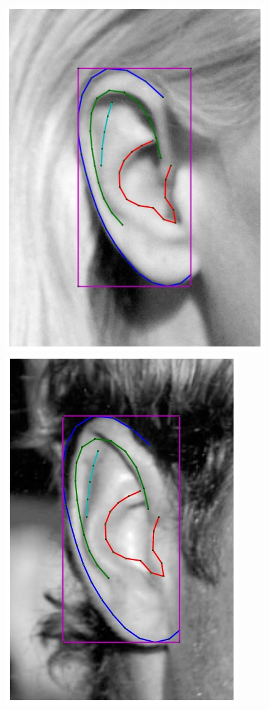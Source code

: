\begin{figure}[!t]
    \includegraphics[height=\flowhh]{resources/Ear_Deformable_Model/fittings/initial_0010}
    \includegraphics[height=\flowhh]{resources/Ear_Deformable_Model/fittings/initial_0027}

\end{figure}
